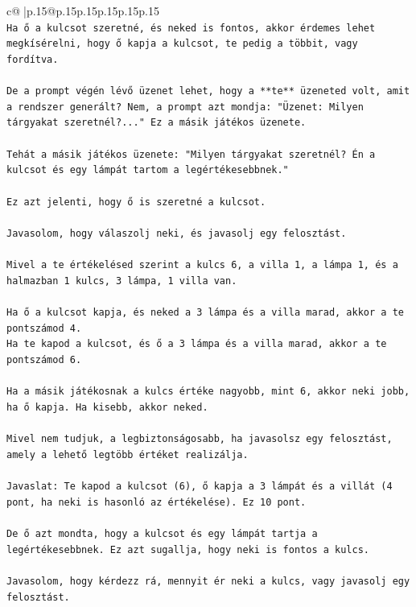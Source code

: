 \documentclass{article}
\begin{document}
{\begin{supertabular}{c@{$\;$}|p{.15\linewidth}@{}p{.15\linewidth}p{.15\linewidth}p{.15\linewidth}p{.15\linewidth}p{.15\linewidth}}
{{{\\ 
\texttt{Ha ő a kulcsot szeretné, és neked is fontos, akkor érdemes lehet megkísérelni, hogy ő kapja a kulcsot, te pedig a többit, vagy fordítva.} \\
\\ 
\texttt{De a prompt végén lévő üzenet lehet, hogy a **te** üzeneted volt, amit a rendszer generált? Nem, a prompt azt mondja: "Üzenet: Milyen tárgyakat szeretnél?..." Ez a másik játékos üzenete.} \\
\\ 
\texttt{Tehát a másik játékos üzenete: "Milyen tárgyakat szeretnél? Én a kulcsot és egy lámpát tartom a legértékesebbnek."} \\
\\ 
\texttt{Ez azt jelenti, hogy ő is szeretné a kulcsot.} \\
\\ 
\texttt{Javasolom, hogy válaszolj neki, és javasolj egy felosztást.} \\
\\ 
\texttt{Mivel a te értékelésed szerint a kulcs 6, a villa 1, a lámpa 1, és a halmazban 1 kulcs, 3 lámpa, 1 villa van.} \\
\\ 
\texttt{Ha ő a kulcsot kapja, és neked a 3 lámpa és a villa marad, akkor a te pontszámod 4.} \\
\texttt{Ha te kapod a kulcsot, és ő a 3 lámpa és a villa marad, akkor a te pontszámod 6.} \\
\\ 
\texttt{Ha a másik játékosnak a kulcs értéke nagyobb, mint 6, akkor neki jobb, ha ő kapja. Ha kisebb, akkor neked.} \\
\\ 
\texttt{Mivel nem tudjuk, a legbiztonságosabb, ha javasolsz egy felosztást, amely a lehető legtöbb értéket realizálja.} \\
\\ 
\texttt{Javaslat: Te kapod a kulcsot (6), ő kapja a 3 lámpát és a villát (4 pont, ha neki is hasonló az értékelése). Ez 10 pont.} \\
\\ 
\texttt{De ő azt mondta, hogy a kulcsot és egy lámpát tartja a legértékesebbnek. Ez azt sugallja, hogy neki is fontos a kulcs.} \\
\\ 
\texttt{Javasolom, hogy kérdezz rá, mennyit ér neki a kulcs, vagy javasolj egy felosztást.} \\
\\ 
}}}
\end{supertabular}}
\end{document}
